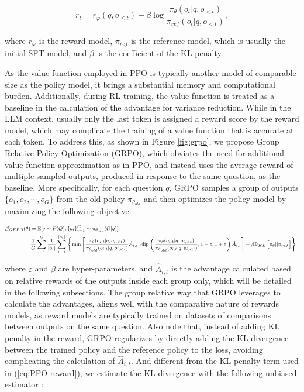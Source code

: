 \begin{equation}
    r_{t} = r_\varphi(q, o_{\le t}) - \beta \log\frac{\pi_{\theta}(o_{t}|q, o_{<t})}{\pi_{ref}(o_{t}|q, o_{<t})},
\label{eq:PPO-reward}
\end{equation}

where $r_\varphi$  is the reward model, $\pi_{ref}$ is the reference model, which is usually the initial SFT model, and $\beta$  is the coefficient of the KL penalty.

As the value function employed in PPO is typically another model of comparable size as the policy model, it brings a substantial memory and computational burden. Additionally, during RL training, the value function is treated as a baseline in the calculation of the advantage for variance reduction. While in the LLM context, usually only the last token is assigned a reward score by the reward model, which may complicate the training of a value function that is accurate at each token. To address this, as shown in Figure \ref{fig:grpo}, we propose Group Relative Policy Optimization (GRPO), which obviates the need for additional value function approximation as in PPO, and instead uses the average reward of multiple sampled outputs, produced in response to the same question, as the baseline. More specifically, for each question $q$, GRPO samples a group of outputs $\{o_1, o_2, \cdots, o_G\}$  from the old policy  $\pi_{\theta_{old}}$  and then optimizes the policy model by maximizing the following objective:

\begin{equation}
\footnotesize
\begin{split}
    \mathcal{J}_{GRPO}(\theta) &= \mathbb{E}{[q \sim P(Q), \{o_i\}_{i=1}^G \sim \pi_{\theta_{old}}(O|q)]}  \\
    & \frac{1}{G}\sum_{i=1}^G\frac{1}{|o_i|} \sum_{t=1}^{|o_i|} \left\{ \min \left[ \frac{\pi_\theta(o_{i,t} | q, o_{i,<t})}{\pi_{\theta_{old}}(o_{i,t} | q, o_{i,<t})} \hat{A}_{i,t}, \text{clip} \left( \frac{\pi_\theta(o_{i,t} | q, o_{i,<t})}{\pi_{\theta_{old}}(o_{i,t} | q, o_{i,<t})}, 1 - \varepsilon, 1 + \varepsilon \right)  \hat{A}_{i,t} \right] - \beta \mathbb{D}_{KL}\left[\pi_{\theta} || \pi_{ref}\right]\right\} ,
\end{split}
\label{eq:GRPO-obj}
\end{equation}

where $\varepsilon$ and $\beta$ are hyper-parameters, and $\hat{A}_{i,t}$  is the advantage calculated based on relative rewards of the outputs inside each group only, which will be detailed in the following subsections. The group relative way that GRPO leverages to calculate the advantages, aligns well with the comparative nature of rewards models,  as reward models are typically trained on datasets of comparisons between outputs on the same question. Also note that, instead of adding KL penalty in the reward, GRPO regularizes by directly adding the KL divergence between the trained policy and the reference policy to the loss, avoiding complicating the calculation of  $\hat{A}_{i,t}$. And different from the KL penalty term used in (\ref{eq:PPO-reward}), we estimate the KL divergence with the following unbiased estimator \citep{kl_approx}:

